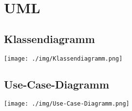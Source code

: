 \chapter{UML}

\section{Klassendiagramm}
\begin{minipage}{\linewidth}
\centering%
\texttt{[image: ./img/Klassendiagramm.png]}%
%
\label{fig:Klassendiagramm}%
\end{minipage}
\vspace{10px}





\section{Use-Case-Diagramm}
\begin{minipage}{\linewidth}
\centering%
\texttt{[image: ./img/Use-Case-Diagramm.png]}%
\centering
{}%
\label{fig:Use-Case-Diagramm}%
\end{minipage}
\vspace{10px}
